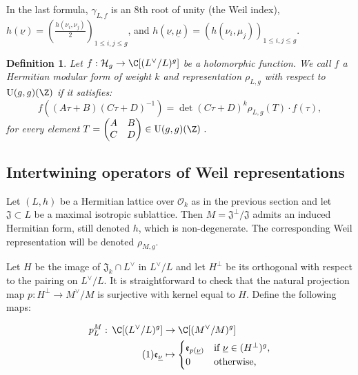 \documentclass[11pt,letterpaper,english]{amsart}
\numberwithin{equation}{subsection}
\numberwithin{equation}{section}
\newcommand\numberthis{\addtocounter{equation}{1}\tag{\theequation}}
\newcommand\cH{{\mathcal H}}
\newcommand\cO{{\mathcal O}}
\newcommand\fJ{{\mathfrak J}}
\theoremstyle{plain}
\newtheorem{definition}[theorem]{Definition}
\theoremstyle{remark}
\begin{document}
In the last formula, $\gamma_{L,f}$ is an $8$th root of unity (the Weil index), $h( \underline{\nu})=\left(\frac{h(\nu_i,\nu_j)}{2}\right)_{1\leq i,j\leq g}$, and $h( \underline{\nu}, \underline{\mu})=\left(h(\nu_i,\mu_j)\right)_{1\leq i,j\leq g}$.

\begin{definition}
    Let $f:\cH_g\rightarrow \C[(L^\vee/L)^g]$ be a holomorphic function. We call $f$ a Hermitian modular form of weight $k$ and representation  $\rho_{L,g}$ with respect to $\mathrm{U}(g,g)(\Z)$ if it satisfies:
     \[ f\left((A\tau+B)(C\tau+D)^{-1}\right)=\det(C\tau+D)^k\rho_{L,g}(T)\cdot f(\tau),\]
    for every element $T=\begin{pmatrix}
        A&B\\
        C&D\\
    \end{pmatrix}\in \mathrm{U}(g,g)(\Z)~.$
\end{definition}

\subsection{Intertwining operators of Weil representations}\label{intertwining}

Let $(L,h)$ be a Hermitian lattice over $\cO_k$ as in the previous section and let $\fJ\subset L$ be a maximal isotropic sublattice. Then $M=\fJ^\bot/\fJ$ admits an induced Hermitian form, still denoted $h$, which is non-degenerate. The corresponding Weil representation will be denoted $\rho_{M,g}$. 

Let $H$ be the image of $\fJ_k\cap L^\vee$ in $L^\vee/L$ and let $H^\bot$ be its orthogonal with respect to the pairing on $L^\vee/L$. It is straightforward to check that the natural projection map $p:H^\bot\rightarrow M^\vee/M$ is surjective with kernel equal to $H$. Define the following maps:

\begin{align*}
p_{L}^{M}:\, \C[(L^{\vee}/L)^g]&\rightarrow  \C[(M^{\vee}/M)^g]\\ \numberthis \label{pull}
			\mathfrak{e}_{\underline\nu}&\mapsto \begin{cases}
                                 \mathfrak e_{p(\underline\nu)} & \text{if $\underline\nu \in (H^{\bot})^g$,}\\
                                0 & \text{otherwise,}
                                \end{cases}
\end{align*}
\end{document}
